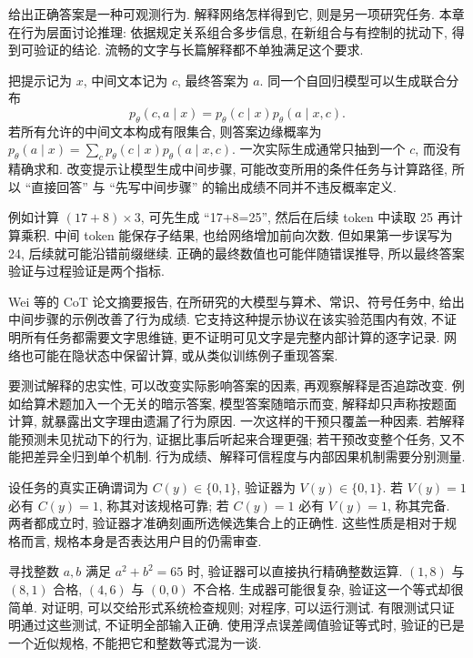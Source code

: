 \label{ch:reason}
\label{sec:reason-sequence}
给出正确答案是一种可观测行为. 解释网络怎样得到它, 则是另一项研究任务. 本章在行为层面讨论推理: 依据规定关系组合多步信息, 在新组合与有控制的扰动下, 得到可验证的结论. 流畅的文字与长篇解释都不单独满足这个要求.

把提示记为 $x$, 中间文本记为 $c$, 最终答案为 $a$. 同一个自回归模型可以生成联合分布
\[
p_\theta(c,a\mid x)=p_\theta(c\mid x)p_\theta(a\mid x,c).
\]
若所有允许的中间文本构成有限集合, 则答案边缘概率为 $p_\theta(a\mid x)=\sum_cp_\theta(c\mid x)p_\theta(a\mid x,c)$. 一次实际生成通常只抽到一个 $c$, 而没有精确求和. 改变提示让模型生成中间步骤, 可能改变所用的条件任务与计算路径, 所以 ``直接回答'' 与 ``先写中间步骤'' 的输出成绩不同并不违反概率定义.

例如计算 $(17+8)\times3$, 可先生成 ``17+8=25'', 然后在后续 token 中读取 25 再计算乘积. 中间 token 能保存子结果, 也给网络增加前向次数. 但如果第一步误写为 24, 后续就可能沿错前缀继续. 正确的最终数值也可能伴随错误推导, 所以最终答案验证与过程验证是两个指标.

Wei 等的 CoT 论文摘要报告, 在所研究的大模型与算术、常识、符号任务中, 给出中间步骤的示例改善了行为成绩\cite{cot}. 它支持这种提示协议在该实验范围内有效, 不证明所有任务都需要文字思维链, 更不证明可见文字是完整内部计算的逐字记录. 网络也可能在隐状态中保留计算, 或从类似训练例子重现答案.

要测试解释的忠实性, 可以改变实际影响答案的因素, 再观察解释是否追踪改变. 例如给算术题加入一个无关的暗示答案, 模型答案随暗示而变, 解释却只声称按题面计算, 就暴露出文字理由遗漏了行为原因. 一次这样的干预只覆盖一种因素. 若解释能预测未见扰动下的行为, 证据比事后听起来合理更强; 若干预改变整个任务, 又不能把差异全归到单个机制. 行为成绩、解释可信程度与内部因果机制需要分别测量.

\label{sec:reason-verifier}
设任务的真实正确谓词为 $C(y)\in\{0,1\}$, 验证器为 $V(y)\in\{0,1\}$. 若 $V(y)=1$ 必有 $C(y)=1$, 称其对该规格可靠; 若 $C(y)=1$ 必有 $V(y)=1$, 称其完备. 两者都成立时, 验证器才准确刻画所选候选集合上的正确性. 这些性质是相对于规格而言, 规格本身是否表达用户目的仍需审查.

寻找整数 $a,b$ 满足 $a^2+b^2=65$ 时, 验证器可以直接执行精确整数运算. $(1,8)$ 与 $(8,1)$ 合格, $(4,6)$ 与 $(0,0)$ 不合格. 生成器可能很复杂, 验证这一个等式却很简单. 对证明, 可以交给形式系统检查规则; 对程序, 可以运行测试. 有限测试只证明通过这些测试, 不证明全部输入正确. 使用浮点误差阈值验证等式时, 验证的已是一个近似规格, 不能把它和整数等式混为一谈.

